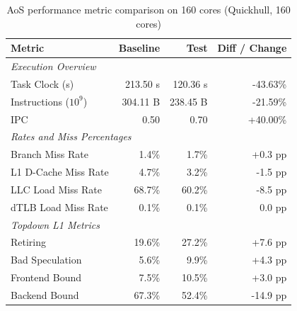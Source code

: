 \begin{table}[htbp]
  \centering
  \caption{AoS performance metric comparison on 160 cores (Quickhull, 160 cores)}
  \label{tab:perf_comparison_aos_quickhull_160cores}
  \begin{tabular}{lrrr}
    \toprule
    \textbf{Metric} & \textbf{Baseline} & \textbf{Test} & \textbf{Diff / Change} \\
    \midrule
    \multicolumn{4}{l}{\textit{Execution Overview}} \\
    \quad Task Clock (s)           & 213.50 s   & 120.36 s   & -43.63\%   \\
    \quad Instructions ($10^9$)    & 304.11 B  & 238.45 B  & -21.59\%   \\
    \quad IPC                      & 0.50       & 0.70       & +40.00\%   \\
    \midrule
    \multicolumn{4}{l}{\textit{Rates and Miss Percentages}} \\
    \quad Branch Miss Rate         & 1.4\%      & 1.7\%      & +0.3 pp    \\
    \quad L1 D-Cache Miss Rate     & 4.7\%      & 3.2\%      & -1.5 pp    \\
    \quad LLC Load Miss Rate       & 68.7\%     & 60.2\%     & -8.5 pp    \\
    \quad dTLB Load Miss Rate      & 0.1\%      & 0.1\%      & 0.0 pp     \\
    \midrule
    \multicolumn{4}{l}{\textit{Topdown L1 Metrics}} \\
    \quad Retiring                 & 19.6\%     & 27.2\%     & +7.6 pp   \\
    \quad Bad Speculation          & 5.6\%     & 9.9\%     & +4.3 pp   \\
    \quad Frontend Bound           & 7.5\%     & 10.5\%     & +3.0 pp   \\
    \quad Backend Bound            & 67.3\%     & 52.4\%     & -14.9 pp   \\
    \bottomrule
  \end{tabular}
\end{table}

